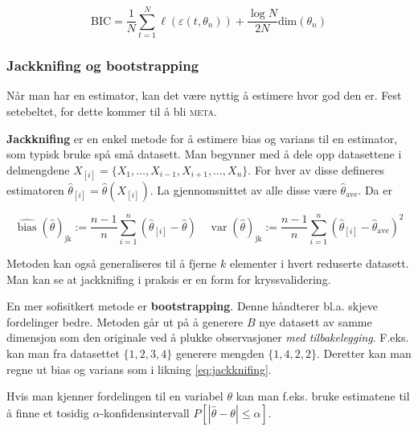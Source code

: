 \begin{equation}
	\textrm{BIC} = \frac{1}{N} \sum_{t = 1}^N \ell (\varepsilon (t, \theta_n)) + \frac{\log N}{2N} \textrm{dim}(\theta_n)
\end{equation}

\subsubsection{Jackknifing og bootstrapping}
Når man har en estimator, kan det være nyttig å estimere hvor god den er. Fest setebeltet, for dette kommer til å bli \textsc{meta}.

\textbf{Jackknifing} er en enkel metode for å estimere bias og varians til en estimator, som typisk bruke spå små datasett. Man begynner med å dele opp datasettene i delmengdene $X_{[i]} = \{X_1, \dots, X_{i-1}, X_{i+1}, \dots, X_n\}$. For hver av disse defineres estimatoren $\hat{\theta}_{[i]} = \hat{\theta}(X_{[i]})$. La gjennomsnittet av alle disse være $\hat{\theta}_{\textrm{ave}}$. Da er

\begin{equation}
	\widehat{\operatorname{bias}}(\widehat{\theta})_{\mathrm{jk}}:=\frac{n-1}{n} \sum_{i=1}^{n}\left(\widehat{\theta}_{[i]}-\widehat{\theta}\right) \quad \operatorname{var}(\widehat{\theta})_{\mathrm{jk}}:=\frac{n-1}{n} \sum_{i=1}^{n}\left(\widehat{\theta}_{[i]}-\widehat{\theta}_{\mathrm{ave}}\right)^{2}
	\label{eq:jackknifing}
\end{equation}

Metoden kan også generaliseres til å fjerne $k$ elementer i hvert reduserte datasett. Man kan se at jackknifing i praksis er en form for kryssvalidering.

En mer sofisitkert metode er \textbf{bootstrapping}. Denne håndterer bl.a. skjeve fordelinger bedre. Metoden går ut på å generere $B$ nye datasett av samme dimensjon som den originale ved å plukke observasjoner \textit{med tilbakelegging}. F.eks. kan man fra datasettet $\{1, 2, 3, 4\}$ generere mengden $\{1, 4, 2, 2\}$. Deretter kan man regne ut bias og varians som i likning \ref{eq:jackknifing}.

Hvis man kjenner fordelingen til en variabel $\theta$ kan man f.eks. bruke estimatene til å finne et tosidig $\alpha$-konfidensintervall $P[ | \hat{\theta} - \theta | \leq \alpha ]$. 


